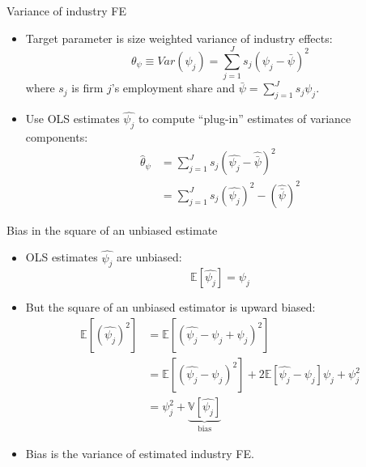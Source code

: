 \documentclass[notes=show]{beamer}
\begin{document}
\begin{frame}{Variance of industry FE}
\begin{itemize}
    \item Target parameter is size weighted variance of industry effects:
    \begin{equation*}
        \theta_{\psi} \equiv Var(\psi_{j}) = \sum_{j=1}^{J} s_{j} (\psi_{j} - \bar{\psi})^2
    \end{equation*}
    where $s_{j}$ is firm $j$'s employment share and $\bar{\psi}=\sum_{j=1}^{J}s_{j}\psi_{j}$.
    \item Use OLS estimates $\hat{\psi_{j}}$ to compute ``plug-in'' estimates of variance components:
    \begin{align*}
         \hat{\theta}_{\psi} & = \sum_{j=1}^{J} s_{j} (\hat{\psi_{j}} - \hat{\bar{\psi}})^2 \\
         & = \sum_{j=1}^{J} s_{j} (\hat{\psi_{j}})^2 - (\hat{\bar{\psi}})^2
    \end{align*}
\end{itemize}
\end{frame}

\begin{frame}{Bias in the square of an unbiased estimate}
\begin{itemize}
    \item OLS estimates $ \hat{\psi_{j}} $ are unbiased:
    \begin{equation*}
        \mathbb{E} \left[ \hat{\psi_{j}} \right] = \psi_{j}
    \end{equation*}
    \item But the square of an unbiased estimator is upward biased:
    \begin{align*}
          \mathbb{E} \left[ \left( \hat{\psi_{j}} \right)^{2} \right] & =  \mathbb{E} \left[ \left( \hat{\psi_{j}} - \psi_{j} + \psi_{j} \right)^{2} \right] \\
          & = \mathbb{E} \left[ \left( \hat{\psi_{j}} - \psi_{j} \right) ^{2} \right] + 2 \mathbb{E} \left[ \hat{\psi_{j}} - \psi_{j} \right] \psi_{j} +  \psi_{j}^{2} \\
          & = \psi_{j}^{2} + \underbrace{ \mathbb{V} \left[ \hat{\psi_{j}} \right] }_{\text{bias}}
    \end{align*}
    \item Bias is the variance of estimated industry FE.
\end{itemize}
\end{frame}
\end{document}
